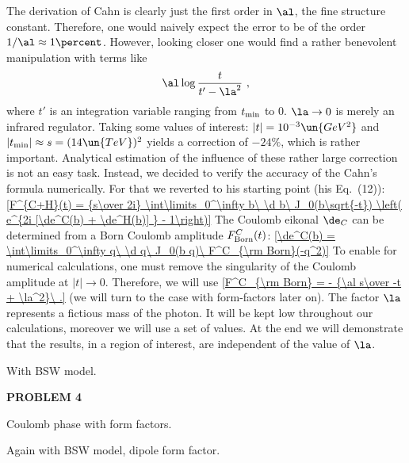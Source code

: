 The derivation of Cahn  is clearly just the first order in $\al$, the fine structure constant. Therefore, one would naively expect the error to be of the order $1/\al\approx 1\percent$. However, looking closer one would find a rather benevolent manipulation with terms like
$$\al \log {t\over t' - \la^2}\ ,$$
where $t'$ is an integration variable ranging from $t_{\rm min}$ to $0$. $\la\to0$ is merely an infrared regulator. Taking some values of interest: $|t| = 10^{-3}\un{GeV^2}$ and $|t_{\rm min}| \approx s = (14\un{TeV})^2$ yields a correction of $-24\percent$, which is rather important. Analytical estimation of the influence of these rather large correction is not an easy task. Instead, we decided to verify the accuracy of the Cahn's formula numerically. For that we reverted to his starting point (his Eq.~(12)):
\eqref{F^{C+H}(t) = {s\over 2i} \int\limits_0^\infty b\ \d b\ J_0(b\sqrt{-t}) \left( e^{2i [\de^C(b) + \de^H(b)] } - 1\right)}{}
The Coulomb eikonal $\de_C$ can be determined from a Born Coulomb amplitude $F^C_{\rm Born}(t)$:
\eqref{\de^C(b) = \int\limits_0^\infty q\ \d q\ J_0(b q)\ F^C_{\rm Born}(-q^2)}{}
To enable for numerical calculations, one must remove the singularity of the Coulomb amplitude at $|t|\to 0$. Therefore, we will use
\eqref{F^C_{\rm Born} = - {\al s\over -t + \la^2}\ .}{}
(we will turn to the case with form-factors later on). The factor $\la$ represents a fictious mass of the photon. It will be kept low throughout our calculations, moreover we will use a set of values. At the end we will demonstrate that the results, in a region of interest, are independent of the value of $\la$.

With BSW model.




{\bf PROBLEM 4}

Coulomb phase with form factors.

Again with BSW model, dipole form factor.





